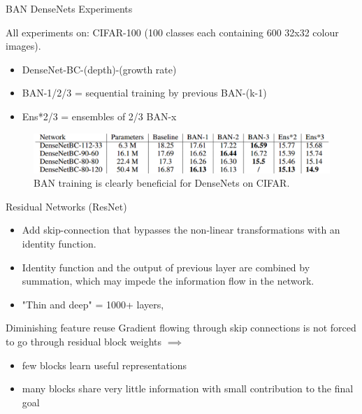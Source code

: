 \documentclass{beamer}
\begin{document}
\begin{frame}{BAN DenseNets Experiments }

All experiments on: CIFAR-100 (100 classes each containing 600 32x32 colour images).

\begin{itemize}
\item DenseNet-BC-(depth)-(growth rate)
\item BAN-1/2/3 = sequential training by previous BAN-(k-1)
\item Ens*2/3 = ensembles of 2/3 BAN-x
\end{itemize}

\begin{figure}[h]
\includegraphics[width=\textwidth]{img/denseNet_experiment}
\caption{BAN training is clearly beneficial for DenseNets on CIFAR. \cite{cit:ban}}
\end{figure}

\end{frame}
\begin{frame}{Residual Networks (ResNet)}
\begin{itemize}
\item Add skip-connection that bypasses the non-linear transformations with an identity function.
\item Identity function and the output of previous layer are combined by summation, which may impede the information flow in the network.
\item "Thin and deep" = 1000+ layers, 
\end{itemize}

\begin{block}{Diminishing feature reuse}
Gradient flowing through skip connections is not forced to go through residual block weights $\implies$ 

\begin{itemize}
\item few blocks learn useful representations 
\item many blocks share very little information with
small contribution to the final goal
\end{itemize}
\end{block}




\end{frame}
\end{document}

